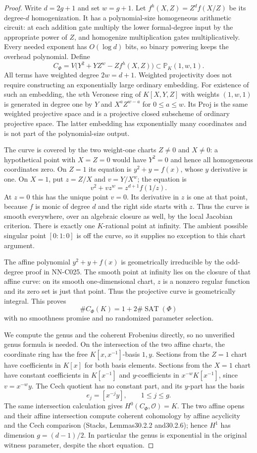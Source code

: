 \begin{proof}
Write $d=2g+1$ and set $w=g+1$. Let $f^h(X,Z)=Z^d f(X/Z)$ be its degree-$d$ homogenization. It has a polynomial-size homogeneous arithmetic circuit: at each addition gate multiply the lower formal-degree input by the appropriate power of $Z$, and homogenize multiplication gates multiplicatively. Every needed exponent has $O(\log d)$ bits, so binary powering keeps the overhead polynomial. Define
\[
 C_\Phi=V\bigl(Y^2+YZ^w-Z f^h(X,Z)\bigr)
              \subset\mathbb P_K(1,w,1).
\]
All terms have weighted degree $2w=d+1$. Weighted projectivity does not require constructing an exponentially large ordinary embedding. For existence of such an embedding, the $w$th Veronese ring of $K[X,Y,Z]$ with weights $(1,w,1)$ is generated in degree one by $Y$ and $X^aZ^{w-a}$ for $0\leq a\leq w$. Its Proj is the same weighted projective space and is a projective closed subscheme of ordinary projective space. The latter embedding has exponentially many coordinates and is not part of the polynomial-size output.

The curve is covered by the two weight-one charts $Z\ne0$ and $X\ne0$: a hypothetical point with $X=Z=0$ would have $Y^2=0$ and hence all homogeneous coordinates zero. On $Z=1$ its equation is $y^2+y=f(x)$, whose $y$ derivative is one. On $X=1$, put $z=Z/X$ and $v=Y/X^w$; the equation is
\[
       v^2+v z^w=z^{d+1}f(1/z).
\]
At $z=0$ this has the unique point $v=0$. Its derivative in $z$ is one at that point, because $f$ is monic of degree $d$ and the right side starts with $z$. Thus the curve is smooth everywhere, over an algebraic closure as well, by the local Jacobian criterion. There is exactly one $K$-rational point at infinity. The ambient possible singular point $[0:1:0]$ is off the curve, so it supplies no exception to this chart argument.

The affine polynomial $y^2+y+f(x)$ is geometrically irreducible by the odd-degree proof in NN-C025. The smooth point at infinity lies on the closure of that affine curve: on its smooth one-dimensional chart, $z$ is a nonzero regular function and its zero set is just that point. Thus the projective curve is geometrically integral. This proves
\[
              \#C_\Phi(K)=1+2\#\operatorname{SAT}(\Phi)
\]
with no smoothness promise and no randomized parameter selection.

We compute the genus and the coherent Frobenius directly, so no unverified genus formula is needed. On the intersection of the two affine charts, the coordinate ring has the free $K[x,x^{-1}]$-basis $1,y$. Sections from the $Z=1$ chart have coefficients in $K[x]$ for both basis elements. Sections from the $X=1$ chart have constant coefficients in $K[x^{-1}]$ and $y$-coefficients in $x^{-w}K[x^{-1}]$, since $v=x^{-w}y$. The Cech quotient has no constant part, and its $y$-part has the basis
\[
       e_j=[x^{-j}y],\qquad 1\leq j\leq g.
\]
The same intersection calculation gives $H^0(C_\Phi,\mathcal O)=K$. The two affine opens and their affine intersection compute coherent cohomology by affine acyclicity and the Cech comparison (Stacks, Lemmas30.2.2 and30.2.6); hence $H^1$ has dimension $g=(d-1)/2$. In particular the genus is exponential in the original witness parameter, despite the short equation.


\end{proof}
